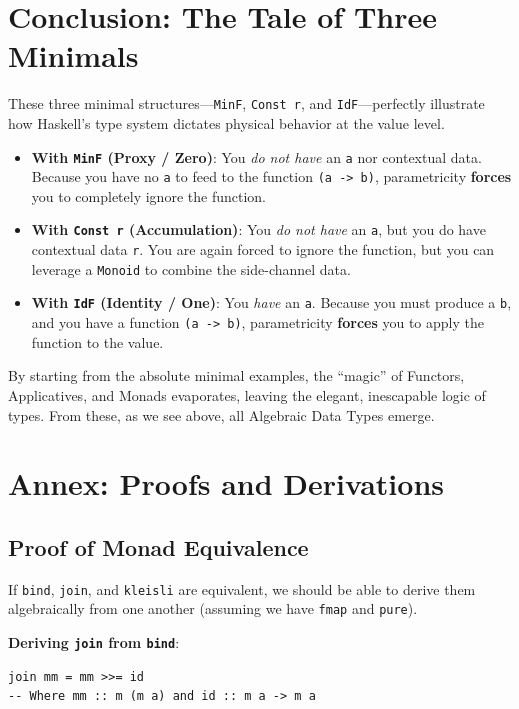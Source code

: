 \documentclass[12pt,a4paper]{article}
\begin{document}
\section{Conclusion: The Tale of Three Minimals}

These three minimal structures---\texttt{MinF}, \texttt{Const r}, and \texttt{IdF}---perfectly illustrate how Haskell's type system dictates physical behavior at the value level.

\begin{itemize}
    \item \textbf{With \texttt{MinF} (Proxy / Zero)}: You \textit{do not have} an \texttt{a} nor contextual data. Because you have no \texttt{a} to feed to the function \texttt{(a -> b)}, parametricity \textbf{forces} you to completely ignore the function.
    \item \textbf{With \texttt{Const r} (Accumulation)}: You \textit{do not have} an \texttt{a}, but you do have contextual data \texttt{r}. You are again forced to ignore the function, but you can leverage a \texttt{Monoid} to combine the side-channel data.
    \item \textbf{With \texttt{IdF} (Identity / One)}: You \textit{have} an \texttt{a}. Because you must produce a \texttt{b}, and you have a function \texttt{(a -> b)}, parametricity \textbf{forces} you to apply the function to the value.
\end{itemize}

By starting from the absolute minimal examples, the ``magic'' of Functors, Applicatives, and Monads evaporates, leaving the elegant, inescapable logic of types. From these, as we see above, all Algebraic Data Types emerge.

\section{Annex: Proofs and Derivations}

\subsection{Proof of Monad Equivalence}
If \texttt{bind}, \texttt{join}, and \texttt{kleisli} are equivalent, we should be able to derive them algebraically from one another (assuming we have \texttt{fmap} and \texttt{pure}).

\textbf{Deriving \texttt{join} from \texttt{bind}}:
\begin{lstlisting}
join mm = mm >>= id  
-- Where mm :: m (m a) and id :: m a -> m a
\end{lstlisting}
\end{document}
